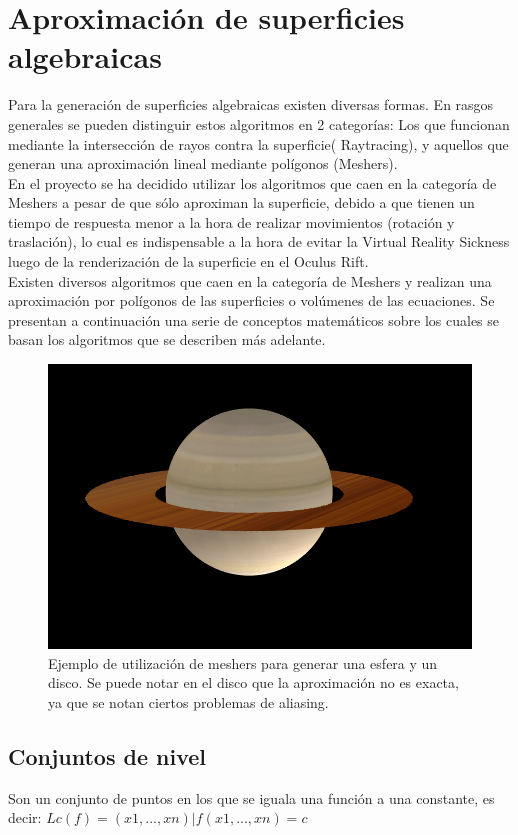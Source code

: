 \documentclass[12pt]{article}
\begin{document}
\section{Aproximación de superficies algebraicas}
Para la generación de superficies algebraicas existen diversas formas. En rasgos generales se pueden distinguir estos algoritmos en 2 categorías: Los que funcionan mediante la intersección de rayos contra la superficie( Raytracing), y aquellos que generan una aproximación lineal mediante polígonos (Meshers).
\\En el proyecto se ha decidido utilizar los algoritmos que caen en la categoría de Meshers\cite{mykola1}\cite{mykola2} a pesar de que sólo aproximan la superficie, debido a que tienen un tiempo de respuesta menor a la hora de realizar movimientos (rotación y traslación), lo cual es indispensable a la hora de evitar la Virtual Reality Sickness luego de la renderización de la superficie en el Oculus Rift.
\\Existen diversos algoritmos que caen en la categoría de Meshers y realizan una aproximación por polígonos de las superficies o volúmenes de las ecuaciones. Se presentan a continuación una serie de conceptos matemáticos sobre los cuales se basan los algoritmos que se describen más adelante.
\begin{figure}[h]
\includegraphics[width=\textwidth]{saturno.png}
\caption{Ejemplo de utilización de meshers para generar una esfera y un disco. Se puede notar en el disco que la aproximación no es exacta, ya que se notan ciertos problemas de aliasing.}
\end{figure}
\clearpage
\subsection{Conjuntos de nivel}
Son un conjunto de puntos en los que se iguala una función a una constante, es decir:
$Lc(f) = {(x1,...,xn) | f(x1,...,xn)  = c}$ \cite{implicitas}
\end{document}
